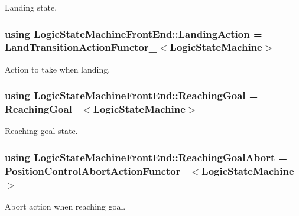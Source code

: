 Landing state. 

\hypertarget{classLogicStateMachineFrontEnd_ad1619c7d43a216eb9238004470389f2e}{
\subsubsection[{Landing\-Action}]{\setlength{\rightskip}{0pt plus 5cm}using {\bf Logic\-State\-Machine\-Front\-End\-::\-Landing\-Action} =  {\bf Land\-Transition\-Action\-Functor\-\_\-}$<${\bf Logic\-State\-Machine}$>$}}\label{classLogicStateMachineFrontEnd_ad1619c7d43a216eb9238004470389f2e}


Action to take when landing. 

\hypertarget{classLogicStateMachineFrontEnd_a8a5e85c9d100560fc79f9cbe1bbd5947}{
\subsubsection[{Reaching\-Goal}]{\setlength{\rightskip}{0pt plus 5cm}using {\bf Logic\-State\-Machine\-Front\-End\-::\-Reaching\-Goal} =  {\bf Reaching\-Goal\-\_\-}$<${\bf Logic\-State\-Machine}$>$}}\label{classLogicStateMachineFrontEnd_a8a5e85c9d100560fc79f9cbe1bbd5947}


Reaching goal state. 

\hypertarget{classLogicStateMachineFrontEnd_a6273a06430b7aa6088e25d9b78805f1a}{
\subsubsection[{Reaching\-Goal\-Abort}]{\setlength{\rightskip}{0pt plus 5cm}using {\bf Logic\-State\-Machine\-Front\-End\-::\-Reaching\-Goal\-Abort} =  {\bf Position\-Control\-Abort\-Action\-Functor\-\_\-}$<${\bf Logic\-State\-Machine}$>$}}\label{classLogicStateMachineFrontEnd_a6273a06430b7aa6088e25d9b78805f1a}


Abort action when reaching goal. 

